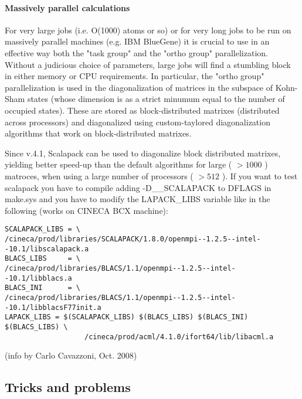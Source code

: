 \documentclass[12pt,a4paper]{article}
\begin{document}
\paragraph{Massively parallel calculations}
For very large jobs (i.e. O(1000) atoms or so) or for very long jobs
to be run on massively parallel  machines (e.g. IBM BlueGene) it is
crucial to use in an effective way both the "task group" and the
"ortho group" parallelization. Without a judicious choice of
parameters, large jobs will find a stumbling block in either memory or 
CPU requirements. In particular, the "ortho group" parallelization is
used in the diagonalization  of matrices in the subspace of Kohn-Sham
states (whose dimension is as a strict minumum equal to the number of
occupied states). These are stored as block-distributed matrixes
(distributed across processors) and diagonalized using custom-taylored
diagonalization algorithms that work on block-distributed matrixes.

Since v.4.1, Scalapack can be used to diagonalize block distributed
matrixes, yielding better speed-up than the default algorithms for
large ( $ > 1000$ ) matroces, when using a large number of processors 
( $> 512$ ). If you want to test scalapack  you have to compile adding
-D\_\_SCALAPACK to DFLAGS in make.sys and you have to  
modify the LAPACK\_LIBS variable like in the following (works on
CINECA BCX machine): 
\begin{verbatim}
SCALAPACK_LIBS = \
/cineca/prod/libraries/SCALAPACK/1.8.0/openmpi--1.2.5--intel--10.1/libscalapack.a
BLACS_LIBS     = \
/cineca/prod/libraries/BLACS/1.1/openmpi--1.2.5--intel--10.1/libblacs.a 
BLACS_INI      = \
/cineca/prod/libraries/BLACS/1.1/openmpi--1.2.5--intel--10.1/libblacsF77init.a
LAPACK_LIBS = $(SCALAPACK_LIBS) $(BLACS_LIBS) $(BLACS_INI) $(BLACS_LIBS) \
                   /cineca/prod/acml/4.1.0/ifort64/lib/libacml.a
\end{verbatim}
(info by Carlo Cavazzoni, Oct. 2008)

\subsection{Tricks and problems}
\end{document}
